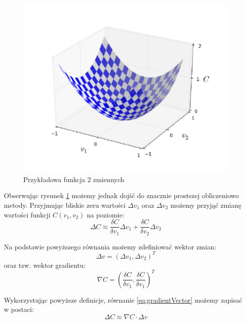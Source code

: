\documentclass[12pt,twoside]{article}
\begin{document}
\begin{figure}[ht]
	\centering
	\includegraphics[width=12cm]{figures/models/gradientExample.png}
	\caption{Przykładowa funkcja 2 zmiennych \cite{nndl}}
	\label{Fig:simpleCost}
\end{figure}

Obserwując rysunek \ref{Fig:simpleCost} możemy jednak dojść do znacznie prostszej obliczeniowo metody.
Przyjmując bliskie zeru wartości $\Delta v_1$ oraz $\Delta v_2$ możemy przyjąć \cite{nndl} zmianę wartości funkcji $C(v_1, v_2)$ na poziomie:
\begin{equation}
	\label{eq:deltaC}
	\Delta C \approx \frac{\delta C}{\delta v_1} \Delta v_1 + \frac{\delta C}{\delta v_2} \Delta v_2
\end{equation}

Na podstawie powyższego równania możemy \cite{nndl} zdefiniować wektor zmian:
\begin{equation}
	\label{eq:changeVector}
	\Delta v = (\Delta v_1, \Delta v_2)^T
\end{equation}
oraz tzw. wektor gradientu:
\begin{equation}
	\label{eq:gradientVector}
	\nabla C = \left(\frac{\delta C}{\delta v_1},\frac{\delta C}{\delta v_1}\right)^T
\end{equation}

Wykorzystując powyższe definicje, równanie \ref{eq:gradientVector} możemy \cite{nndl} zapisać w postaci:
\begin{equation}
	\label{eq:costGradientVector}
	\Delta C \approx \nabla C \cdot \Delta v
\end{equation}
\end{document}
